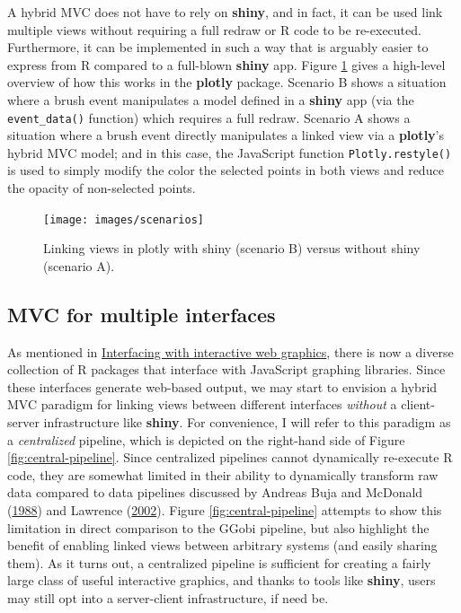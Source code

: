 \documentclass[12pt,]{isuthesis}
\begin{document}
A hybrid MVC does not have to rely on \textbf{shiny}, and in fact, it
can be used link multiple views without requiring a full redraw or R
code to be re-executed. Furthermore, it can be implemented in such a way
that is arguably easier to express from R compared to a full-blown
\textbf{shiny} app. Figure \ref{fig:scenarios} gives a high-level
overview of how this works in the \textbf{plotly} package. Scenario B
shows a situation where a brush event manipulates a model defined in a
\textbf{shiny} app (via the \texttt{event\_data()} function) which
requires a full redraw. Scenario A shows a situation where a brush event
directly manipulates a linked view via a \textbf{plotly}'s hybrid MVC
model; and in this case, the JavaScript function
\texttt{Plotly.restyle()} is used to simply modify the color the
selected points in both views and reduce the opacity of non-selected
points.

\begin{figure}
\centering
\texttt{[image: images/scenarios]}
\caption{\label{fig:scenarios}Linking views in plotly with shiny (scenario
B) versus without shiny (scenario A).}
\end{figure}

\subsection{MVC for multiple
interfaces}\label{mvc-for-multiple-interfaces}

As mentioned in
\protect\hyperlink{interfacing-with-interactive-web-graphics}{Interfacing
with interactive web graphics}, there is now a diverse collection of R
packages that interface with JavaScript graphing libraries. Since these
interfaces generate web-based output, we may start to envision a hybrid
MVC paradigm for linking views between different interfaces
\emph{without} a client-server infrastructure like \textbf{shiny}. For
convenience, I will refer to this paradigm as a \emph{centralized}
pipeline, which is depicted on the right-hand side of Figure
\ref{fig:central-pipeline}. Since centralized pipelines cannot
dynamically re-execute R code, they are somewhat limited in their
ability to dynamically transform raw data compared to data pipelines
discussed by Andreas Buja and McDonald
(\protect\hyperlink{ref-viewing-pipeline}{1988}) and Lawrence
(\protect\hyperlink{ref-ggobi-pipeline-design}{2002}). Figure
\ref{fig:central-pipeline} attempts to show this limitation in direct
comparison to the GGobi pipeline, but also highlight the benefit of
enabling linked views between arbitrary systems (and easily sharing
them). As it turns out, a centralized pipeline is sufficient for
creating a fairly large class of useful interactive graphics, and thanks
to tools like \textbf{shiny}, users may still opt into a server-client
infrastructure, if need be.
\end{document}

